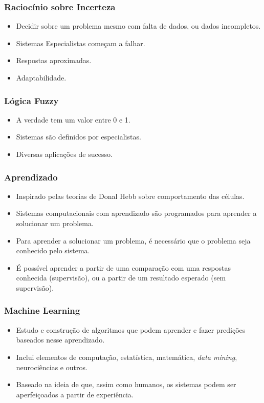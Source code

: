 \documentclass[aspectratio=169,12pt]{beamer}
\begin{document}
\begin{frame}
    \frametitle{Raciocínio sobre Incerteza}
    \begin{itemize}
        \setlength\itemsep{1em}
        \item Decidir sobre um problema mesmo com falta de dados,
        ou dados incompletos.
        \item Sistemas Especialistas começam a falhar.
        \item Respostas aproximadas.
        \item Adaptabilidade.
    \end{itemize}
\end{frame}
    
\begin{frame}
    \frametitle{Lógica Fuzzy}
    \begin{itemize}
        \setlength\itemsep{1em}
        \item A verdade tem um valor entre 0 e 1.
        \item Sistemas são definidos por especialistas.
        \item Diversas aplicações de sucesso.
    \end{itemize}
\end{frame}
    
\begin{frame}
    \frametitle{Aprendizado}
    \begin{itemize}
        \setlength\itemsep{1em}
        \item Inspirado pelas teorias de Donal Hebb sobre comportamento
        das células.
        \item Sistemas computacionais com aprendizado são programados
        para aprender a solucionar um problema.
        \item Para aprender a solucionar um problema, é necessário que
        o problema seja conhecido pelo sistema.
        \item É possível aprender a partir de uma comparação com uma
        respostas conhecida (supervisão), ou a partir de um resultado
        esperado (sem supervisão).
    \end{itemize}
\end{frame}
    
\begin{frame}
    \frametitle{Machine Learning}
    \begin{itemize}
        \setlength\itemsep{1em}
        \item Estudo e construção de algoritmos que podem aprender
        e fazer predições baseados nesse aprendizado.
        \item Inclui elementos de computação, estatística, matemática,
        \emph{data mining}, neurociências e outros.
        \item Baseado na ideia de que, assim como humanos, os
        sistemas podem ser aperfeiçoados a partir de experiência.
    \end{itemize}
\end{frame}
    
\end{document}

